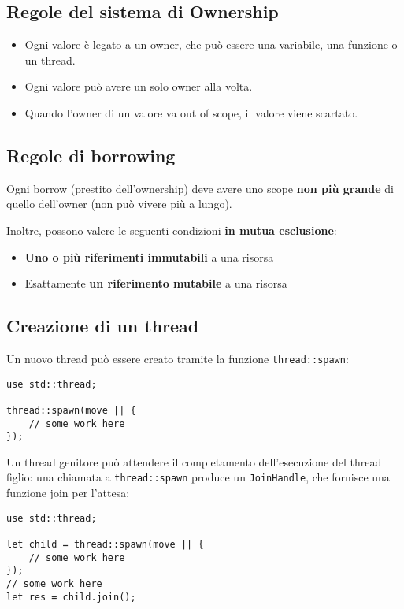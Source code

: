 \subsection{Regole del sistema di Ownership}

\begin{itemize}
  \item Ogni valore è legato a un owner, che può essere una variabile, una funzione
o un thread.
  \item Ogni valore può avere un solo owner alla volta.
  \item Quando l'owner di un valore va out of scope, il valore viene scartato.
\end{itemize}

\subsection{Regole di borrowing}

Ogni borrow (prestito dell'ownership) deve avere uno scope \textbf{non più grande} di
quello dell’owner (non può vivere più a lungo).

Inoltre, possono valere le seguenti condizioni \textbf{in mutua esclusione}:

\begin{itemize}
\item \textbf{Uno o più riferimenti immutabili} a una risorsa
\item Esattamente \textbf{un riferimento mutabile} a una risorsa
\end{itemize}

\subsection{Creazione di un thread}

Un nuovo thread può essere creato tramite la funzione \texttt{thread::spawn}:

\begin{verbatim}
use std::thread;

thread::spawn(move || {
    // some work here
});
\end{verbatim}

Un thread genitore può attendere il completamento dell'esecuzione del thread
figlio: una chiamata a \texttt{thread::spawn} produce un \texttt{JoinHandle},
che fornisce una funzione join per l'attesa:

\begin{verbatim}
use std::thread;

let child = thread::spawn(move || {
    // some work here
});
// some work here
let res = child.join();
\end{verbatim}


